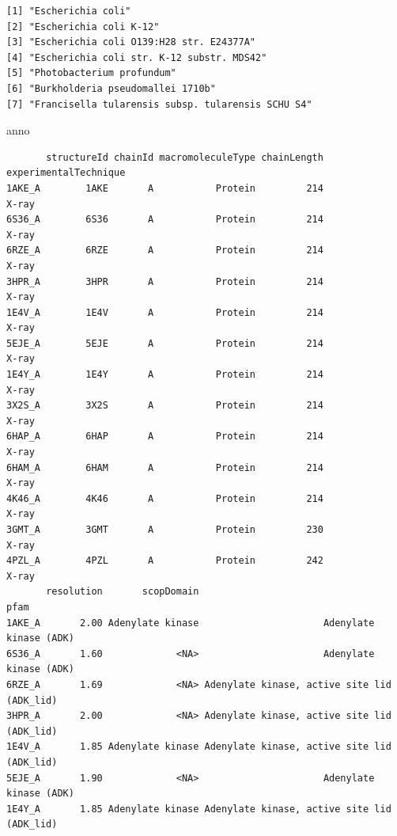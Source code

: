 \documentclass[
  letterpaper,
  DIV=11,
  numbers=noendperiod]{scrartcl}
\newenvironment{Shaded}{\begin{snugshade}}{\end{snugshade}}
\newcommand{\NormalTok}[1]{\textcolor[rgb]{0.00,0.23,0.31}{#1}}
\begin{document}
\begin{verbatim}
[1] "Escherichia coli"                                
[2] "Escherichia coli K-12"                           
[3] "Escherichia coli O139:H28 str. E24377A"          
[4] "Escherichia coli str. K-12 substr. MDS42"        
[5] "Photobacterium profundum"                        
[6] "Burkholderia pseudomallei 1710b"                 
[7] "Francisella tularensis subsp. tularensis SCHU S4"
\end{verbatim}

\begin{Shaded}
\begin{Highlighting}[]
\NormalTok{anno}
\end{Highlighting}
\end{Shaded}

\begin{verbatim}
       structureId chainId macromoleculeType chainLength experimentalTechnique
1AKE_A        1AKE       A           Protein         214                 X-ray
6S36_A        6S36       A           Protein         214                 X-ray
6RZE_A        6RZE       A           Protein         214                 X-ray
3HPR_A        3HPR       A           Protein         214                 X-ray
1E4V_A        1E4V       A           Protein         214                 X-ray
5EJE_A        5EJE       A           Protein         214                 X-ray
1E4Y_A        1E4Y       A           Protein         214                 X-ray
3X2S_A        3X2S       A           Protein         214                 X-ray
6HAP_A        6HAP       A           Protein         214                 X-ray
6HAM_A        6HAM       A           Protein         214                 X-ray
4K46_A        4K46       A           Protein         214                 X-ray
3GMT_A        3GMT       A           Protein         230                 X-ray
4PZL_A        4PZL       A           Protein         242                 X-ray
       resolution       scopDomain                                        pfam
1AKE_A       2.00 Adenylate kinase                      Adenylate kinase (ADK)
6S36_A       1.60             <NA>                      Adenylate kinase (ADK)
6RZE_A       1.69             <NA> Adenylate kinase, active site lid (ADK_lid)
3HPR_A       2.00             <NA> Adenylate kinase, active site lid (ADK_lid)
1E4V_A       1.85 Adenylate kinase Adenylate kinase, active site lid (ADK_lid)
5EJE_A       1.90             <NA>                      Adenylate kinase (ADK)
1E4Y_A       1.85 Adenylate kinase Adenylate kinase, active site lid (ADK_lid)

\end{verbatim}
\end{document}
